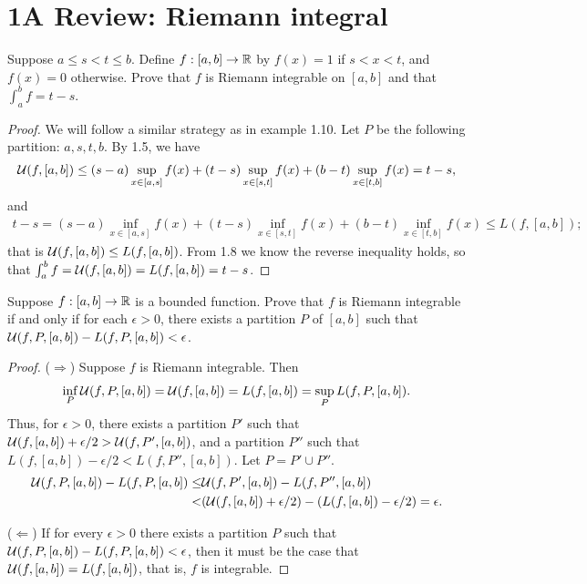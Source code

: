 \section{1A Review: Riemann integral}

\begin{exercise}{2}
Suppose $a \leq s < t \leq b$.
Define $f:[a,b]\to\mathbb{R}$ by $f(x)=1$ if $s<x<t$, and $f(x)=0$ otherwise.
Prove that $f$ is Riemann integrable on $[a,b]$ and that $\int_a^b f = t-s$.
\end{exercise}
\begin{proof}
We will follow a similar strategy as in example 1.10.
Let $P$ be the following partition: $a,s,t,b$.
By 1.5, we have
\begin{align*}
    \mathcal{U}(f,[a,b])
    \leq (s-a)\sup_{x\in[a,s]} f(x) 
    + (t-s)\sup_{x\in[s,t]} f(x) 
    + (b-t)\sup_{x\in[t,b]} f(x)
    = t-s,
\end{align*}
and
\begin{align*}
    t-s
    =(s-a)\inf_{x\in[a,s]} f(x) 
    + (t-s)\inf_{x\in[s,t]} f(x) 
    + (b-t)\inf_{x\in[t,b]} f(x)
    \leq L(f,[a,b]);
\end{align*}
that is $\mathcal{U}(f,[a,b]) \leq L(f,[a,b])$.
From 1.8 we know the reverse inequality holds, so that $\int_a^b f = \mathcal{U}(f,[a,b]) = L(f,[a,b]) = t-s$.
\end{proof} 

\begin{exercise}{3}
Suppose $f:[a,b]\to\mathbb{R}$ is a bounded function. 
Prove that $f$ is Riemann integrable if and only if for each $\epsilon>0$, there exists a partition $P$ of $[a,b]$ such that $\mathcal{U}(f,P,[a,b]) - L(f,P,[a,b]) < \epsilon$.
\end{exercise}
\begin{proof}
($\Rightarrow$)
Suppose $f$ is Riemann integrable.
Then 
\begin{align*}
    \inf_P \mathcal{U}(f,P,[a,b]) = \mathcal{U}(f,[a,b]) = L(f,[a,b]) = \sup_P L(f,P,[a,b]).
\end{align*}
Thus, for $\epsilon>0$, there exists a partition $P'$ such that $\mathcal{U}(f,[a,b]) + \epsilon/2 > \mathcal{U}(f,P',[a,b])$, and a partition $P''$ such that $L(f,[a,b]) - \epsilon/2 < L(f,P'',[a,b])$.
Let $P = P' \cup P''$.
\begin{align*}
    \mathcal{U}(f,P,[a,b]) - L(f,P,[a,b]) 
    \leq& \mathcal{U}(f,P',[a,b]) - L(f,P'',[a,b])\\
    <& (\mathcal{U}(f,[a,b]) + \epsilon/2) 
    - (L(f,[a,b]) - \epsilon/2) = \epsilon.
\end{align*}

($\Leftarrow$)
If for every $\epsilon>0$ there exists a partition $P$ such that  $\mathcal{U}(f,P,[a,b]) - L(f,P,[a,b]) < \epsilon$, then it must be the case that $\mathcal{U}(f,[a,b]) = L(f,[a,b])$, that is, $f$ is integrable.
\end{proof} 

